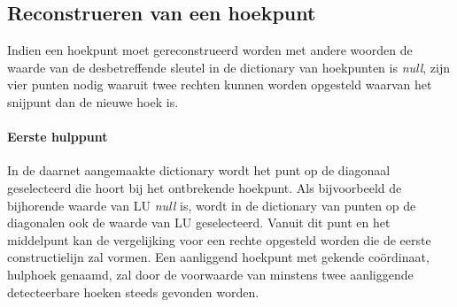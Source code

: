 	\subsection{Reconstrueren van een hoekpunt}
		
		Indien een hoekpunt moet gereconstrueerd worden met andere woorden de waarde van de desbetreffende sleutel in de dictionary van hoekpunten is \textit{null}, zijn vier punten nodig waaruit twee rechten kunnen worden opgesteld waarvan het snijpunt dan de nieuwe hoek is. 
		\paragraph{Eerste hulppunt} In de daarnet aangemaakte dictionary wordt het punt op de diagonaal geselecteerd die hoort bij het ontbrekende hoekpunt. Als bijvoorbeeld de bijhorende waarde van LU \textit{null} is, wordt in de dictionary van punten op de diagonalen ook de waarde van LU geselecteerd.
		 Vanuit dit punt en het middelpunt kan de vergelijking voor een rechte opgesteld worden die de eerste constructielijn zal vormen. 
		 Een aanliggend hoekpunt met gekende coördinaat, hulphoek genaamd, zal door de voorwaarde van minstens twee aanliggende detecteerbare hoeken steeds gevonden worden. 

